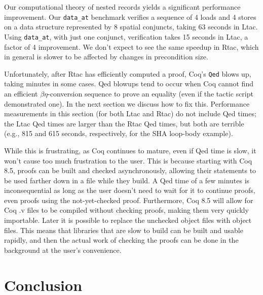 \documentclass{puthesis}
\begin{document}
Our computational theory of nested records yields 
a significant performance improvement.
Our \lstinline{data_at} benchmark verifies a sequence of 
4 loads and 4 stores
on a data structure represented by 8 spatial conjuncts,
taking 63 seconds in Ltac.  Using 
\lstinline{data_at}, with just one conjunct, 
verification takes 15 seconds in Ltac, a factor of 4 improvement.
We don't expect to see the same speedup in Rtac, which in
general is slower to be affected by changes in precondition size.

Unfortunately, after Rtac has efficiently computed a proof,
Coq's \lstinline|Qed| blows up, taking minutes  in some cases.
Qed blowups tend to occur when Coq cannot find an efficient
$\beta\eta$-conversion sequence to prove an equality
(even if the tactic script demonstrated one).
In the next section we discuss how to fix this.
Performance measurements in this section (for both Ltac and Rtac)
do not include Qed times; the Ltac Qed times are larger than
the Rtac Qed times, but both are terrible (e.g., 815 and 615 seconds,
respectively, for the SHA loop-body example).

While this is frustrating, as Coq continues to mature, even if Qed
time is slow, it won't cause too much frustration to the user. This is
because starting with Coq 8.5, proofs can be built and checked
asynchronously, allowing their statements to be used farther down in a
file while they build. A Qed time of a few minutes is inconsequential
as long as the user doesn't need to wait for it to continue proofs,
even proofs using the not-yet-checked proof. Furthermore, Coq 8.5 will allow for Coq .v
files to be compiled without checking proofs, making them very quickly
importable. Later it is possible to replace the unchecked object files
with object files. This means that libraries that are slow to build
can be built and usable rapidly, and then the actual work of checking
the proofs can be done in the background at the user's convenience.

\chapter{Conclusion}



\end{document}
